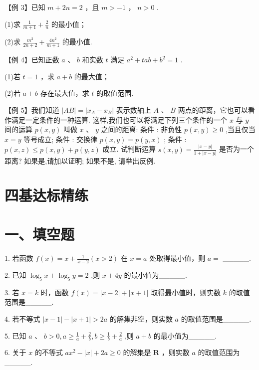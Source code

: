 【例 3】已知 $m + {2n} = 2$ ，且 $m >  - 1$ ， $n > 0$ .

(1)求 $\frac{1}{m + 1} + \frac{2}{n}$ 的最小值；

(2)求 $\frac{{m}^{2}}{{2n} + 2} + \frac{4{n}^{2}}{m + 1}$ 的最小值.

【例 4】已知正数 $a$ 、 $b$ 和实数 $t$ 满足 ${a}^{2} + {tab} + {b}^{2} = 1$ .

(1)若 $t = 1$ ，求 $a + b$ 的最大值；

(2)若 $a + b$ 存在最大值，求 $t$ 的取值范围.

【例 5】我们知道 $\left| {AB}\right|  = \left| {{x}_{A} - {x}_{B}}\right|$ 表示数轴上 $A$ 、 $B$ 两点的距离，它也可以看作满足一定条件的一种运算. 这样,我们也可以将满足下列三个条件的一个 $x$ 与 $y$ 间的运算 $p\left( {x,y}\right)$ 叫做 $x\text{ 、 }y$ 之间的距离: 条件  : 非负性 $p\left( {x,y}\right)  \geq  0$ ,当且仅当 $x = y$ 等号成立; 条件  : 交换律 $p\left( {x,y}\right)  = p\left( {y,x}\right)$ ; 条件  : $p\left( {x,z}\right)  \leq  p\left( {x,y}\right)  + p\left( {y,z}\right)$ 成立. 试判断运算 $s\left( {x,y}\right)  = \frac{\left| x - y\right| }{1 + \left| {x - y}\right| }$ 是否为一个距离? 如果是,请加以证明; 如果不是, 请举出反例.

\section*{四基达标精练}

\section*{一、填空题}

1. 若函数 $f\left( x\right)  = x + \frac{1}{x - 2}\left( {x > 2}\right)$ 在 $x = a$ 处取得最小值，则 $a =$ \_\_\_\_\_.

2. 已知 ${\log }_{5}x + {\log }_{5}y = 2$ ,则 $x + {4y}$ 的最小值为\_\_\_\_\_.

3. 若 $x = k$ 时，函数 $f\left( x\right)  = \left| {x - 2}\right|  + \left| {x + 1}\right|$ 取得最小值时，则实数 $k$ 的取值范围是\_\_\_\_\_.

4. 若不等式 $\left| {x - 1}\right|  - \left| {x + 1}\right|  > {2a}$ 的解集非空，则实数 $a$ 的取值范围是\_\_\_\_\_.

5. 已知 $a\text{ 、 }b > 0,a \geq  \frac{1}{a} + \frac{2}{b},b \geq  \frac{1}{b} + \frac{2}{a}$ ,则 $a + b$ 的最小值为\_\_\_\_\_.

6. 关于 $x$ 的不等式 $a{x}^{2} - \left| x\right|  + {2a} \geq  0$ 的解集是 $\mathbf{R}$ ，则实数 $a$ 的取值范围为\_\_\_\_\_.

